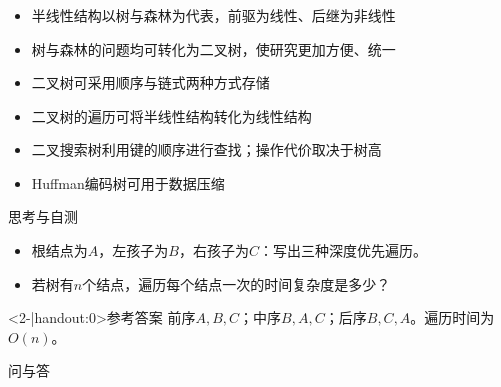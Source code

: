 \begin{frame}
    \frametitle{\insertsectionhead}
    \begin{itemize}
        \item 半线性结构以树与森林为代表，前驱为线性、后继为非线性
        \item 树与森林的问题均可转化为二叉树，使研究更加方便、统一
        \item 二叉树可采用顺序与链式两种方式存储
        \item 二叉树的遍历可将半线性结构转化为线性结构
        \item 二叉搜索树利用键的顺序进行查找；操作代价取决于树高
        \item Huffman编码树可用于数据压缩
    \end{itemize}
\end{frame}

\begin{frame}{思考与自测}
    \begin{itemize}
        \item 根结点为$A$，左孩子为$B$，右孩子为$C$：写出三种深度优先遍历。
        \item 若树有$n$个结点，遍历每个结点一次的时间复杂度是多少？
    \end{itemize}
    \pause
    \begin{block}<2-|handout:0>{参考答案}
        前序$A,B,C$；中序$B,A,C$；后序$B,C,A$。遍历时间为$O(n)$。
    \end{block}
\end{frame}

\begin{standout}[]
    问与答
\end{standout}